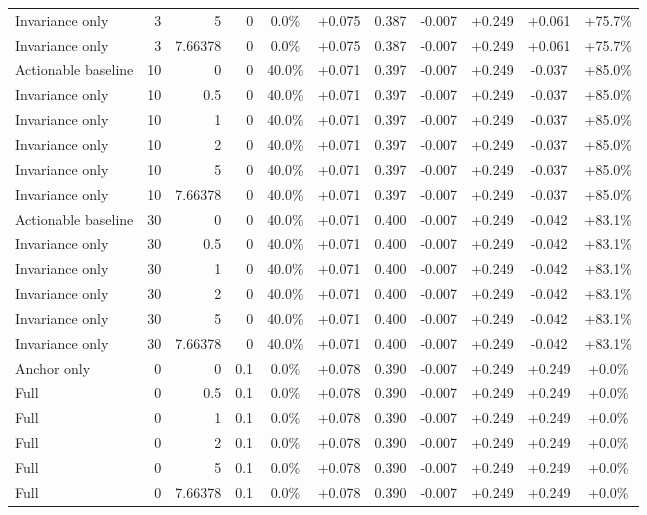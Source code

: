 \begin{table}[htbp]
\begin{tabular}{lrrrccccccc}
Invariance only & 3 & 5 & 0 & 0.0\% & +0.075 & 0.387 & -0.007 & +0.249 & +0.061 & +75.7\% \\
Invariance only & 3 & 7.66378 & 0 & 0.0\% & +0.075 & 0.387 & -0.007 & +0.249 & +0.061 & +75.7\% \\
Actionable baseline & 10 & 0 & 0 & 40.0\% & +0.071 & 0.397 & -0.007 & +0.249 & -0.037 & +85.0\% \\
Invariance only & 10 & 0.5 & 0 & 40.0\% & +0.071 & 0.397 & -0.007 & +0.249 & -0.037 & +85.0\% \\
Invariance only & 10 & 1 & 0 & 40.0\% & +0.071 & 0.397 & -0.007 & +0.249 & -0.037 & +85.0\% \\
Invariance only & 10 & 2 & 0 & 40.0\% & +0.071 & 0.397 & -0.007 & +0.249 & -0.037 & +85.0\% \\
Invariance only & 10 & 5 & 0 & 40.0\% & +0.071 & 0.397 & -0.007 & +0.249 & -0.037 & +85.0\% \\
Invariance only & 10 & 7.66378 & 0 & 40.0\% & +0.071 & 0.397 & -0.007 & +0.249 & -0.037 & +85.0\% \\
Actionable baseline & 30 & 0 & 0 & 40.0\% & +0.071 & 0.400 & -0.007 & +0.249 & -0.042 & +83.1\% \\
Invariance only & 30 & 0.5 & 0 & 40.0\% & +0.071 & 0.400 & -0.007 & +0.249 & -0.042 & +83.1\% \\
Invariance only & 30 & 1 & 0 & 40.0\% & +0.071 & 0.400 & -0.007 & +0.249 & -0.042 & +83.1\% \\
Invariance only & 30 & 2 & 0 & 40.0\% & +0.071 & 0.400 & -0.007 & +0.249 & -0.042 & +83.1\% \\
Invariance only & 30 & 5 & 0 & 40.0\% & +0.071 & 0.400 & -0.007 & +0.249 & -0.042 & +83.1\% \\
Invariance only & 30 & 7.66378 & 0 & 40.0\% & +0.071 & 0.400 & -0.007 & +0.249 & -0.042 & +83.1\% \\
Anchor only & 0 & 0 & 0.1 & 0.0\% & +0.078 & 0.390 & -0.007 & +0.249 & +0.249 & +0.0\% \\
Full & 0 & 0.5 & 0.1 & 0.0\% & +0.078 & 0.390 & -0.007 & +0.249 & +0.249 & +0.0\% \\
Full & 0 & 1 & 0.1 & 0.0\% & +0.078 & 0.390 & -0.007 & +0.249 & +0.249 & +0.0\% \\
Full & 0 & 2 & 0.1 & 0.0\% & +0.078 & 0.390 & -0.007 & +0.249 & +0.249 & +0.0\% \\
Full & 0 & 5 & 0.1 & 0.0\% & +0.078 & 0.390 & -0.007 & +0.249 & +0.249 & +0.0\% \\
Full & 0 & 7.66378 & 0.1 & 0.0\% & +0.078 & 0.390 & -0.007 & +0.249 & +0.249 & +0.0\% \\

\end{tabular}
\end{table}
